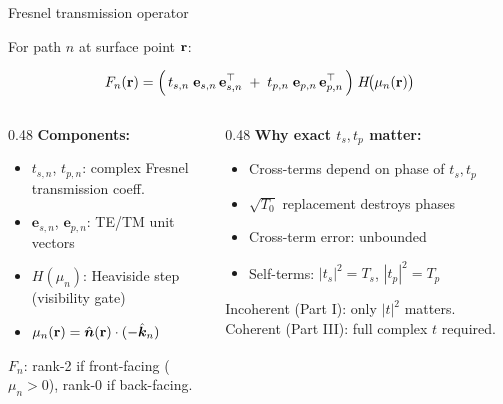 \begin{frame}[label=app-p3-fresnel-op]{Fresnel transmission operator}

  {\small For path $n$ at surface point $\mathbf{r}$:}
  \vspace{-1pt}
  \begin{resultbox}
    \vspace{-4pt}
    \[
      F_n(\mathbf{r}) = \Bigl(\,
        t_{s,n}\;\mathbf{e}_{s,n}\,\mathbf{e}_{s,n}^\top
        \;+\;
        t_{p,n}\;\mathbf{e}_{p,n}\,\mathbf{e}_{p,n}^\top
      \,\Bigr)\;
      H\!\bigl(\mu_n(\mathbf{r})\bigr)
    \]
  \end{resultbox}
  \vspace{-2pt}
  {\footnotesize
  \begin{columns}[T]
    \begin{column}{0.48\textwidth}
      \textbf{Components:}
      \begin{itemize}\setlength\itemsep{0pt}
        \item $t_{s,n}$, $t_{p,n}$: complex Fresnel transmission coeff.
        \item $\mathbf{e}_{s,n}$, $\mathbf{e}_{p,n}$: TE/TM unit vectors
        \item $H(\mu_n)$: Heaviside step (visibility gate)
        \item $\mu_n(\mathbf{r}) = \hat{\bm{n}}(\mathbf{r}) \cdot (-\hat{\bm{k}}_n)$
      \end{itemize}
      \vspace{-2pt}
      $F_n$: rank-2 if front-facing ($\mu_n > 0$), rank-0 if back-facing.
    \end{column}
    \begin{column}{0.48\textwidth}
      \textbf{Why exact $t_s, t_p$ matter:}
      \begin{itemize}\setlength\itemsep{0pt}
        \item Cross-terms depend on phase of $t_s, t_p$
        \item $\sqrt{T_0}$ replacement destroys phases
        \item Cross-term error: unbounded
        \item Self-terms: $|t_s|^2 = T_s$, $|t_p|^2 = T_p$
      \end{itemize}
      \vspace{-2pt}
      Incoherent (Part I): only $|t|^2$ matters.
      Coherent (Part III): full complex $t$ required.
    \end{column}
  \end{columns}
  }
  \vspace{-4pt}
\end{frame}

